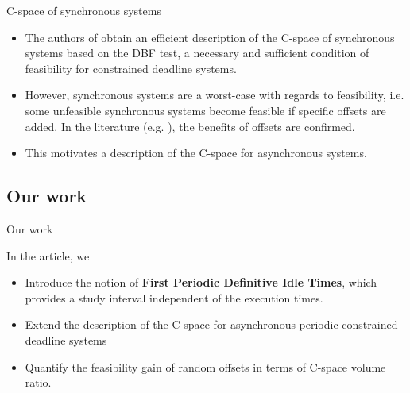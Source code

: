 \documentclass{beamer}
\newcommand{\dbf}[1]{\operatorname{dbf}(#1)}
\begin{document}
    \begin{frame}{C-space of synchronous systems}

    \begin{itemize}
        \item The authors of \cite{george2009characterization} obtain an efficient description of the C-space of synchronous systems based on the DBF test\cite{baruah1990algorithms}, a necessary and sufficient condition of feasibility for constrained deadline systems.
        \item However, synchronous systems are a worst-case with regards to feasibility, i.e. some unfeasible synchronous systems become feasible if specific offsets are added. In the literature (e.g. \cite{goossens2003scheduling}), the benefits of offsets are confirmed.
        \item This motivates a description of the C-space for asynchronous systems.

    \end{itemize}







    \end{frame}

	\subsection{Our work}

	\begin{frame}{Our work}

	In the article, we
    \begin{itemize}
        \item Introduce the notion of \textbf{First Periodic Definitive Idle Times}, which provides a study interval independent of the execution times.
        \item Extend the description of the C-space for asynchronous periodic constrained deadline systems
        \item Quantify the feasibility gain of random offsets in terms of C-space volume ratio.
    \end{itemize}

	\end{frame}
\end{document}
